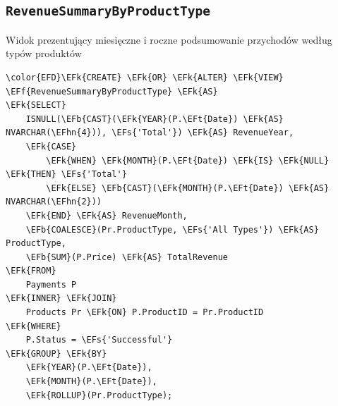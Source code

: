 \documentclass[11pt]{article}
\newcommand{\EFs}[1]{\textcolor{EFs}{#1}} %
\newcommand{\EFk}[1]{\textcolor{EFk}{\textbf{#1}}} %
\newcommand{\EFb}[1]{\textcolor{EFb}{\textbf{#1}}} %
\newcommand{\EFf}[1]{\textcolor{EFf}{#1}} %
\newcommand{\EFt}[1]{\textcolor{EFt}{\textbf{#1}}} %
\newcommand{\EFhn}[1]{\textcolor{EFhn}{#1}} %
\begin{document}
\subsection{\texttt{RevenueSummaryByProductType}}
\label{sec:org5ae22f8}
Widok prezentujący miesięczne i roczne podsumowanie przychodów według typów produktów
\begin{Code}
\begin{Verbatim}
\color{EFD}\EFk{CREATE} \EFk{OR} \EFk{ALTER} \EFk{VIEW} \EFf{RevenueSummaryByProductType} \EFk{AS}
\EFk{SELECT}
    ISNULL(\EFb{CAST}(\EFk{YEAR}(P.\EFt{Date}) \EFk{AS} NVARCHAR(\EFhn{4})), \EFs{'Total'}) \EFk{AS} RevenueYear,
    \EFk{CASE} 
        \EFk{WHEN} \EFk{MONTH}(P.\EFt{Date}) \EFk{IS} \EFk{NULL} \EFk{THEN} \EFs{'Total'}
        \EFk{ELSE} \EFb{CAST}(\EFk{MONTH}(P.\EFt{Date}) \EFk{AS} NVARCHAR(\EFhn{2})) 
    \EFk{END} \EFk{AS} RevenueMonth,
    \EFb{COALESCE}(Pr.ProductType, \EFs{'All Types'}) \EFk{AS} ProductType,
    \EFb{SUM}(P.Price) \EFk{AS} TotalRevenue
\EFk{FROM}
    Payments P
\EFk{INNER} \EFk{JOIN}
    Products Pr \EFk{ON} P.ProductID = Pr.ProductID
\EFk{WHERE}
    P.Status = \EFs{'Successful'}
\EFk{GROUP} \EFk{BY}
    \EFk{YEAR}(P.\EFt{Date}),
    \EFk{MONTH}(P.\EFt{Date}),
    \EFk{ROLLUP}(Pr.ProductType);
\end{Verbatim}
\end{Code}
\end{document}
